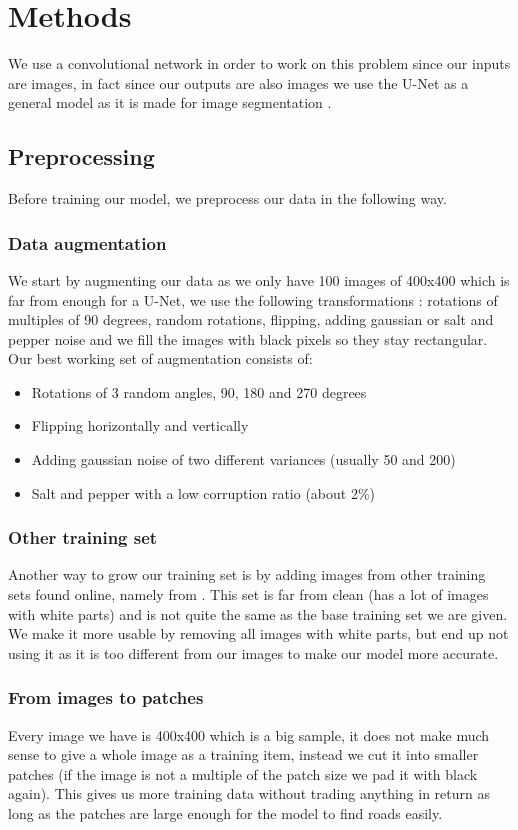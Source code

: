 \documentclass[10pt,conference,compsocconf]{IEEEtran}
\begin{document}
\section{Methods}
We use a convolutional network in order to work on this problem since our inputs are images, in fact since our outputs are also images we use the U-Net as a general model as it is made for image segmentation \cite{wiki:u-net}.
\subsection{Preprocessing}
\label{preprocess}
Before training our model, we preprocess our data in the following way.
\subsubsection{Data augmentation}
We start by augmenting our data as we only have 100 images of 400x400 which is far from enough for a U-Net, we use the following transformations : rotations of multiples of 90 degrees, random rotations, flipping, adding gaussian or salt and pepper noise and we fill the images with black pixels so they stay rectangular. Our best working set of augmentation consists of:
\begin{itemize}
\item Rotations of 3 random angles, 90, 180 and 270 degrees
\item Flipping horizontally and vertically
\item Adding gaussian noise of two different variances (usually 50 and 200)
\item Salt and pepper with a low corruption ratio (about 2\%)
\end{itemize}
\subsubsection{Other training set}
\label{otherset}
Another way to grow our training set is by adding images from other training sets found online, namely from \cite{newtraining}. This set is far from clean (has a lot of images with white parts) and is not quite the same as the base training set we are given. We make it more usable by removing all images with white parts, but end up not using it as it is too different from our images to make our model more accurate.
\subsubsection{From images to patches}
Every image we have is 400x400 which is a big sample, it does not make much sense to give a whole image as a training item, instead we cut it into smaller patches (if the image is not a multiple of the patch size we pad it with black again). This gives us more training data without trading anything in return as long as the patches are large enough for the model to find roads easily.
\end{document}

